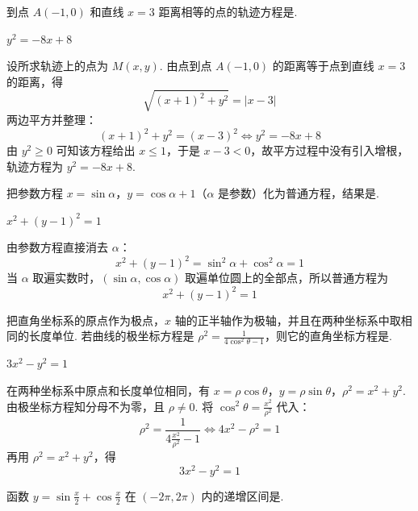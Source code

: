 \begin{problem}
到点 \(A(-1,0)\) 和直线 \(x=3\) 距离相等的点的轨迹方程是\fillinblank{}.
\end{problem}

\begin{answer}
\(y^2=-8x+8\)
\end{answer}

\begin{solution}
设所求轨迹上的点为 \(M(x,y)\). 由点到点 \(A(-1,0)\) 的距离等于点到直线 \(x=3\) 的距离，得
\[
\sqrt{(x+1)^2+y^2}=|x-3|
\]
两边平方并整理：
\[
(x+1)^2+y^2=(x-3)^2
\iff y^2=-8x+8
\]
由 \(y^2\geqslant0\) 可知该方程给出 \(x\leqslant1\)，于是 \(x-3<0\)，故平方过程中没有引入增根，轨迹方程为 \(y^2=-8x+8\).
\end{solution}

\begin{problem}
把参数方程 \(x=\sin\alpha\)，\(y=\cos\alpha+1\)（\(\alpha\) 是参数）化为普通方程，结果是\fillinblank{}.
\end{problem}

\begin{answer}
\(x^2+(y-1)^2=1\)
\end{answer}

\begin{solution}
由参数方程直接消去 \(\alpha\)：
\[
x^2+(y-1)^2=\sin^2\alpha+\cos^2\alpha=1
\]
当 \(\alpha\) 取遍实数时，\((\sin\alpha,\cos\alpha)\) 取遍单位圆上的全部点，所以普通方程为
\[
x^2+(y-1)^2=1
\]
\end{solution}

\begin{problem}
把直角坐标系的原点作为极点，\(x\) 轴的正半轴作为极轴，并且在两种坐标系中取相同的长度单位. 若曲线的极坐标方程是 \(\rho^2=\frac{1}{4\cos^2\theta-1}\)，则它的直角坐标方程是\fillinblank{}.
\end{problem}

\begin{answer}
\(3x^2-y^2=1\)
\end{answer}

\begin{solution}
在两种坐标系中原点和长度单位相同，有
\(x=\rho\cos\theta\)，\(y=\rho\sin\theta\)，\(\rho^2=x^2+y^2\).
由极坐标方程知分母不为零，且 \(\rho\ne0\). 将 \(\cos^2\theta=\frac{x^2}{\rho^2}\) 代入：
\[
\rho^2=\frac{1}{4\frac{x^2}{\rho^2}-1}
\iff 4x^2-\rho^2=1
\]
再用 \(\rho^2=x^2+y^2\)，得
\[
3x^2-y^2=1
\]
\end{solution}

\begin{problem}
函数 \(y=\sin\frac{x}{2}+\cos\frac{x}{2}\) 在 \((-2\pi,2\pi)\) 内的递增区间是\fillinblank{}.
\end{problem}

